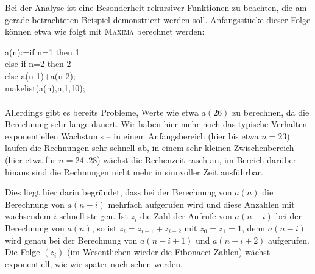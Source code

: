 \documentclass[11pt,a4paper]{article}
\newcommand{\cas}[1]{\textsc{#1}}
\begin{document}
Bei der Analyse ist eine Besonderheit rekursiver Funktionen zu beachten, die
am gerade betrachteten Beispiel demonstriert werden soll.  Anfangsstücke
dieser Folge können etwa wie folgt mit \cas{Maxima} berechnet werden:
\begin{code}
  a(n):=if n=1 then 1\+\\
  else if n=2 then 2\\
  else a(n-1)+a(n-2);\-\\[4pt]
  makelist(a(n),n,1,10);
\end{code}
\begin{gather*}
  [1, 2, 3, 5, 8, 13, 21, 34, 55, 89]
\end{gather*}
Allerdings gibt es bereits Probleme, Werte wie etwa $a(26)$ zu berechnen, da
die Berechnung sehr lange dauert.  Wir haben hier mehr noch das typische
Verhalten exponentiellen Wachstums -- in einem Anfangsbereich (hier bis etwa
$n=23$) laufen die Rechnungen sehr schnell ab, in einem sehr kleinen
Zwischenbereich (hier etwa für $n=24..28$) wächst die Rechenzeit rasch an, im
Bereich darüber hinaus sind die Rechnungen nicht mehr in sinnvoller Zeit
ausführbar.

Dies liegt hier darin begründet, dass bei der Berechnung von $a(n)$ die
Berechnung von $a(n-i)$ mehrfach aufgerufen wird und diese Anzahlen mit
wachsendem $i$ schnell steigen.  Ist $z_i$ die Zahl der Aufrufe von $a(n-i)$
bei der Berechnung von $a(n)$, so ist $z_i=z_{i-1}+z_{i-2}$ mit $z_0=z_1=1$,
denn $a(n-i)$ wird genau bei der Berechnung von $a(n-i+1)$ und $a(n-i+2)$
aufgerufen.  Die Folge $(z_i)$ (im Wesentlichen wieder die Fibonacci-Zahlen)
wächst exponentiell, wie wir später noch sehen werden.
\end{document}
